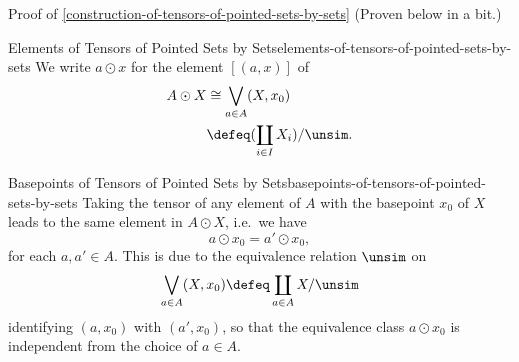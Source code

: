 \begin{Proof}{Proof of \cref{construction-of-tensors-of-pointed-sets-by-sets}}%
    (Proven below in a bit.)
\end{Proof}
\begin{notation}{Elements of Tensors of Pointed Sets by Sets}{elements-of-tensors-of-pointed-sets-by-sets}%
    We write $a\odot x$ for the element $[(a,x)]$ of
    \begin{align*}
        A\odot X &\cong  \bigvee_{a\in A}(X,x_{0})\\%
                 &\defeq (\coprod_{i\in I}X_{i})/\unsim.%
    \end{align*}
\end{notation}
\begin{remark}{Basepoints of Tensors of Pointed Sets by Sets}{basepoints-of-tensors-of-pointed-sets-by-sets}{}%
    Taking the tensor of any element of $A$ with the basepoint $x_{0}$ of $X$ leads to the same element in $A\odot X$, i.e.\ we have
    \[%
        a\odot x_{0}%
        =%
        a'\odot x_{0},%
    \]%
    for each $a,a'\in A$. This is due to the equivalence relation $\unsim$ on
    \[
        \bigvee_{a\in A}(X,x_{0})%
        \defeq%
        \coprod_{a\in A}X/\unsim%
    \]%
    identifying $(a,x_{0})$ with $(a',x_{0})$, so that the equivalence class $a\odot x_{0}$ is independent from the choice of $a\in A$.
\end{remark}
